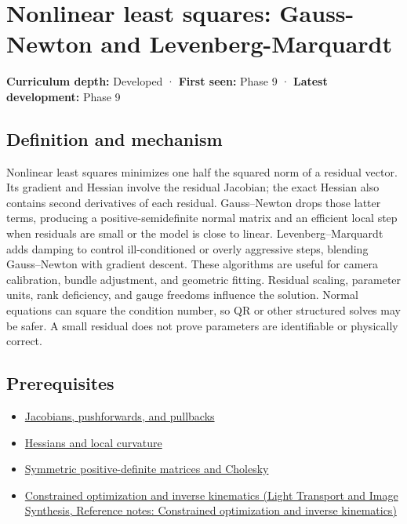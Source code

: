 \hypertarget{appendix-2c2df8345991}{}\label{referencestart:appendix-2c2df8345991}
\section{Nonlinear least squares: Gauss-Newton and Levenberg-Marquardt}\label{appendix-2c2df8345991-nonlinear-least-squares-gauss-newton-and-levenberg-marquardt}

\textbf{Curriculum depth:} Developed · \textbf{First seen:} Phase 9 · \textbf{Latest development:} Phase 9

\begin{allmightroledefinition}

\subsection{Definition and mechanism}\label{appendix-2c2df8345991-definition-and-mechanism}

Nonlinear least squares minimizes one half the squared norm of a residual vector. Its gradient and Hessian involve the residual Jacobian; the exact Hessian also contains second derivatives of each residual. Gauss--Newton drops those latter terms, producing a positive-semidefinite normal matrix and an efficient local step when residuals are small or the model is close to linear. Levenberg--Marquardt adds damping to control ill-conditioned or overly aggressive steps, blending Gauss--Newton with gradient descent. These algorithms are useful for camera calibration, bundle adjustment, and geometric fitting. Residual scaling, parameter units, rank deficiency, and gauge freedoms influence the solution. Normal equations can square the condition number, so QR or other structured solves may be safer. A small residual does not prove parameters are identifiable or physically correct.

\end{allmightroledefinition}

\subsection{Prerequisites}\label{appendix-2c2df8345991-prerequisites}

\begin{itemize}
\tightlist
\item
  \hyperref[appendix-d8a7ddb675eb]{Jacobians, pushforwards, and pullbacks}
\item
  \hyperref[appendix-6ac071f8b50c]{Hessians and local curvature}
\item
  \hyperref[appendix-50d2ea3c9b26]{Symmetric positive-definite matrices and Cholesky}
\item
  \href{../04-Light-Transport-and-Image-Synthesis/main.pdf\#nameddest=appendix-29f4bea4c2bb}{Constrained optimization and inverse kinematics (Light Transport and Image Synthesis, Reference notes: Constrained optimization and inverse kinematics)}
\end{itemize}

